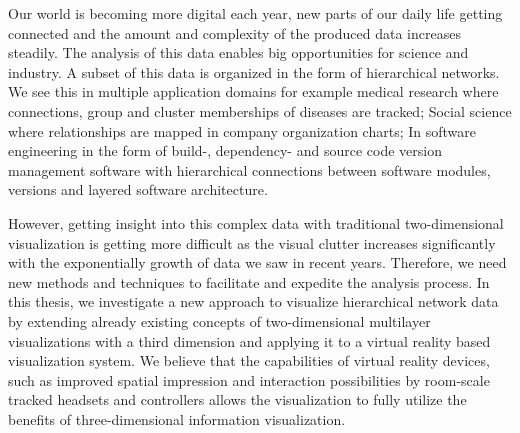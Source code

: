 Our world is becoming more digital each year, new parts of our daily life getting connected and the amount and complexity of the produced data increases steadily.
The analysis of this data enables big opportunities for science and industry.
A subset of this data is organized in the form of hierarchical networks. We see this in multiple application domains for example medical research where connections, group and cluster memberships of diseases are tracked; Social science where relationships are mapped in company organization charts; In software engineering in the form of build-, dependency- and source code version management software with hierarchical connections between software modules, versions and layered software architecture.

However, getting insight into this complex data with traditional two-dimensional visualization is getting more difficult as the visual clutter increases significantly with the exponentially growth of data we saw in recent years. Therefore, we need new methods and techniques to facilitate and expedite the analysis process.
In this thesis, we investigate a new approach to visualize hierarchical network data by extending already existing concepts of two-dimensional multilayer visualizations with a third dimension and applying it to a virtual reality based visualization system. We believe that the capabilities of virtual reality devices, such as improved spatial impression and interaction possibilities by room-scale tracked headsets and controllers allows the visualization to fully utilize the benefits of three-dimensional information visualization.